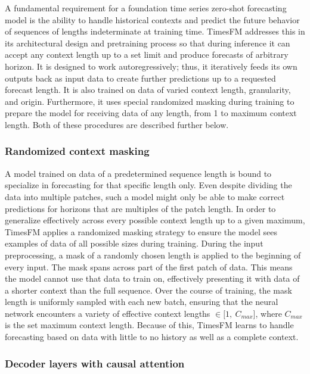 A fundamental requirement for a foundation time series zero-shot forecasting model is the ability to handle historical contexts and predict the future behavior of sequences of lengths indeterminate at training time. TimesFM addresses this in its architectural design and pretraining process so that during inference it can accept any context length up to a set limit and produce forecasts of arbitrary horizon. It is designed to work autoregressively; thus, it iteratively feeds its own outputs back as input data to create further predictions up to a requested forecast length. It is also trained on data of varied context length, granularity, and origin. Furthermore, it uses special randomized masking during training to prepare the model for receiving data of any length, from 1 to maximum context length. Both of these procedures are described further below.

\subsubsection{Randomized context masking}

A model trained on data of a predetermined sequence length is bound to specialize in forecasting for that specific length only. Even despite dividing the data into multiple patches, such a model might only be able to make correct predictions for horizons that are multiples of the patch length. In order to generalize effectively across every possible context length up to a given maximum, TimesFM applies a randomized masking strategy to ensure the model sees examples of data of all possible sizes during training. During the input preprocessing, a mask of a randomly chosen length is applied to the beginning of every input. The mask spans across part of the first patch of data. This means the model cannot use that data to train on, effectively presenting it with data of a shorter context than the full sequence. Over the course of training, the mask length is uniformly sampled with each new batch, ensuring that the neural network encounters a variety of effective context lengths $\in \bigl[1,\ C_{max}\bigr]$, where $C_{max}$ is the set maximum context length. Because of this, TimesFM learns to handle forecasting based on data with little to no history as well as a complete context.

\subsubsection{Decoder layers with causal attention}

